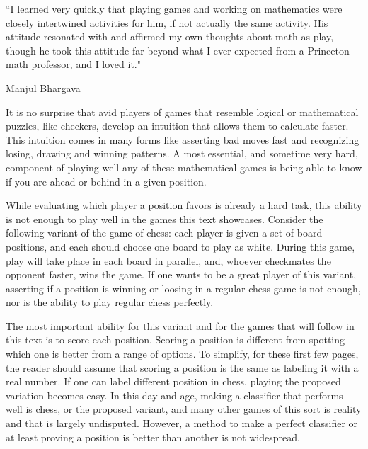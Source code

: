 \renewcommand{\textflush}{flushepinormal}
\setlength{}
\epigraph{``I learned very quickly that playing games and working on mathematics were closely intertwined activities for him, if not actually the same activity. His attitude resonated with and affirmed my own thoughts about math as play, though he took this attitude far beyond what I ever expected from a Princeton math professor, and I loved it."}{Manjul Bhargava \footnotemark}




It is no surprise that avid players of games that resemble logical or mathematical puzzles, like checkers, develop an intuition that allows them to calculate faster. This intuition comes in many forms like asserting bad moves fast and recognizing losing, drawing and winning patterns. A most essential, and sometime very hard, component of playing well any of these mathematical games is being able to know if you are ahead or behind in a given position.

While evaluating which player a position favors is already a hard task, this ability is not enough to play well in the games this text showcases. Consider the following variant of the game of chess: each player is given a set of board positions, and each should choose one board to play as white. During this game, play will take place in each board in parallel, and, whoever checkmates the opponent faster, wins the game. If one wants to be a great player of this variant, asserting if a position is winning or loosing in a regular chess game is not enough, nor is the ability to play regular chess perfectly.

The most important ability for this variant and for the games that will follow in this text is to score each position. Scoring a position is different from spotting which one is better from a range of options. To simplify, for these first few pages, the reader should assume that scoring a position is the same as labeling it with a real number. If one can label different position in chess, playing the proposed variation becomes easy. In this day and age, making a classifier that performs well is chess, or the proposed variant, and many other games of this sort is reality and that is largely undisputed. However, a method to make a perfect classifier or at least proving a position is better than another is not widespread.

